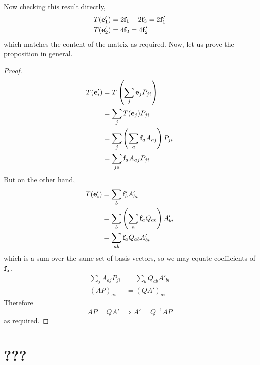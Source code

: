 \documentclass{article}
\begin{document}
Now checking this result directly,
\begin{align*}
    T(\vb e'_1) & = 2\vb f_1 - 2\vb f_3 = 2\vb f_1' \\
    T(\vb e'_2) & = 4\vb f_2 = 4\vb f_2'
\end{align*}
which matches the content of the matrix as required. Now, let us prove the proposition in general.
\begin{proof}
    \begin{align*}
        T(\vb e'_i) & = T\left( \sum_j \vb e_j P_{ji} \right)              \\
                    & = \sum_j T(\vb e_j) P_{ji}                           \\
                    & = \sum_j \left( \sum_a \vb f_a A_{aj} \right) P_{ji} \\
                    & = \sum_{ja} \vb f_a A_{aj} P_{ji}
    \end{align*}
    But on the other hand,
    \begin{align*}
        T(\vb e'_i) & = \sum_b \vb f'_b A'_{bi}                             \\
                    & = \sum_b \left( \sum_a \vb f_a Q_{ab} \right) A'_{bi} \\
                    & = \sum_{ab} \vb f_a Q_{ab} A'_{bi}
    \end{align*}
    which is a sum over the same set of basis vectors, so we may equate coefficients of $\vb f_a$.
    \begin{align*}
        \sum_j A_{aj} P_{ji} & = \sum_b Q_{ab} A'_{bi} \\
        (AP)_{ai}            & = (QA')_{ai}
    \end{align*}
    Therefore
    \[ AP = QA' \implies A' = Q^{-1}AP \]
    as required.
\end{proof}

\section{???}
\end{document}
